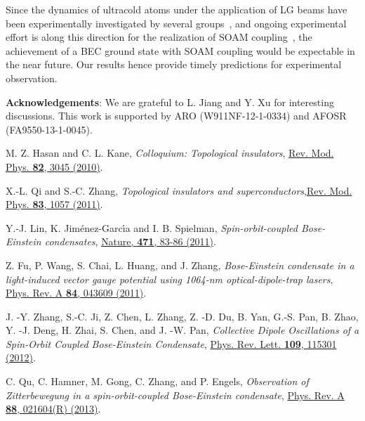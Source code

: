 \documentclass[twocolumn,pra,unsortedaddress,showpacs,floatfix,citeautoscript,nofootinbib]{revtex4-1}
\begin{document}
Since the dynamics of ultracold atoms under the application of LG
beams have been experimentally investigated by several
groups~\cite
{Andersen2006,Ryu2007,Leslie2009,Gullo2010,Beattle2013,Moulder2012},
and ongoing experimental effort is along this direction for the
realization of SOAM coupling~\cite{DAMOP}, the achievement of a
BEC ground state with SOAM coupling would be expectable in the
near future. Our results hence provide timely predictions for
experimental observation.

\textbf{Acknowledgements}: We are grateful to L. Jiang and Y. Xu
for interesting discussions. This work is supported by ARO
(W911NF-12-1-0334) and AFOSR (FA9550-13-1-0045).

\vspace{-0.5cm}
\begin{thebibliography}{99}

 M. Z. Hasan and C. L. Kane, \emph{Colloquium: Topological insulators}, \href{http://dx.doi.org/10.1103/RevModPhys.82.3045}%
{Rev. Mod. Phys. \textbf{82}, 3045 (2010)}.

 X.-L. Qi and S.-C. Zhang, \emph{Topological insulators and superconductors},\href{http://dx.doi.org/10.1103/RevModPhys.83.1057}%
{Rev. Mod. Phys. \textbf{83}, 1057 (2011)}.


 Y.-J. Lin, K. Jim\'{e}nez-Garc\'{\i}a and I. B. Spielman, \emph{Spin-orbit-coupled Bose-Einstein condensates},
\href{http://dx.doi.org/10.1038/nature09887}{Nature, \textbf{471}, 83-86
(2011)}.

 Z. Fu, P. Wang, S. Chai, L. Huang, and J. Zhang, \emph{Bose-Einstein condensate in a light-induced vector gauge potential using 1064-nm optical-dipole-trap lasers}, \href{http://dx.doi.org/10.1103/PhysRevA.84.043609}%
{Phys. Rev. A \textbf{84}, 043609 (2011)}.

 J. -Y. Zhang, S.-C. Ji, Z. Chen, L. Zhang, Z. -D. Du, B.
Yan, G.-S. Pan, B. Zhao, Y. -J. Deng, H. Zhai, S. Chen, and J. -W. Pan, \emph{Collective Dipole Oscillations of a Spin-Orbit Coupled Bose-Einstein Condensate},
\href{http://dx.doi.org/10.1103/PhysRevLett.109.115301}{Phys. Rev. Lett.
\textbf{109}, 115301 (2012)}.

 C. Qu, C. Hamner, M. Gong, C. Zhang, and P. Engels, \emph{Observation of Zitterbewegung in a spin-orbit-coupled Bose-Einstein condensate}, \href{http://dx.doi.org/10.1103/PhysRevA.88.021604}%
{Phys. Rev. A \textbf{88}, 021604(R) (2013)}.


\end{thebibliography}
\end{document}
